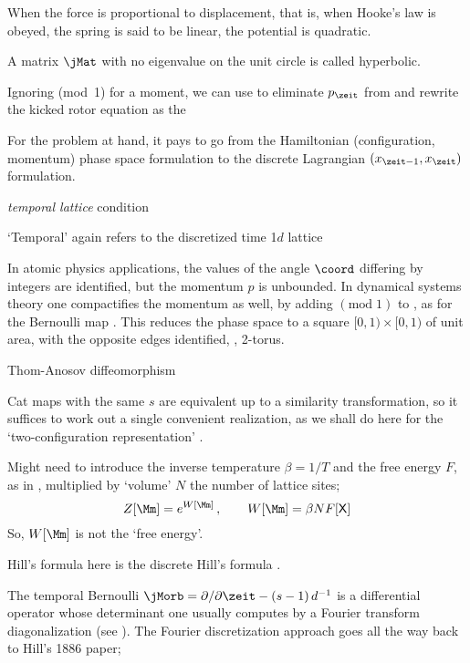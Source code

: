 \begin{description}
{When the force is proportional to displacement, that is, when Hooke's law
is obeyed, the spring is said to be linear, the potential is quadratic.

A matrix $\jMat$ with no eigenvalue on the unit circle is called
hyperbolic.

Ignoring (mod~1) for a moment, we can use
 to eliminate
$p_{\zeit}$ from 
and rewrite the kicked rotor equation as the

For the problem at
hand, it pays to go from the Hamiltonian (configuration, momentum) phase
space formulation to the discrete Lagrangian
$(\ssp_{\zeit-1},\ssp_{\zeit})$ formulation.

\emph{temporal lattice} condition

`Temporal' again refers to the discretized time 1$d$ lattice

In atomic physics applications, the values of the angle $\coord$
differing by integers are identified, but the momentum $p$ is unbounded.
In dynamical systems theory one compactifies the momentum as well, by
adding $(\mbox{mod}\;1)$ to , as for the Bernoulli map
. This reduces the phase space to a square
$[0,1)\times [0,1)$ of unit area, with the opposite edges identified,
\ie, 2-torus.

Thom-Anosov diffeomorphism

Cat maps with the same $s$ are equivalent
up to a similarity transformation, so it suffices to work out a single
convenient realization, as we shall do here for the
\PV{} `two-configuration representation'
.

    }

     {
    Might need to introduce the inverse temperature $\beta = 1/T$ and the
    free energy $F$, as in , multiplied by `volume' $N$
    the number of lattice sites;
\[
  Z[\source]	= e^{W[\source]}
  \,,\qquad
  W[\source] = \beta N F[\Xx]
\]
    So, $W[\source]$ is not the `free energy'.

Hill's formula here is the discrete Hill's formula
.

The temporal Bernoulli {\jacobianOrb} %
$\jMorb=\partial/\partial\zeit-(s-1)\,\shift^{-1}$ is a differential
operator whose determinant one usually computes by a Fourier transform
diagonalization (see ). The Fourier discretization
approach goes all the way back to Hill's 1886 paper;
    }


\end{description}
